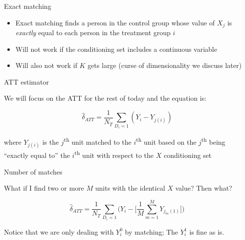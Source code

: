 \documentclass{beamer}
\begin{document}
\begin{frame}{Exact matching}

\begin{itemize}
\item Exact matching finds a person in the control group whose value of $X_j$ is \emph{exactly} equal to each person in the treatment group $i$
\item Will not work if the conditioning set includes a continuous variable
\item Will also not work if $K$ gets large (curse of dimensionality we discuss later)
\end{itemize}

\end{frame}



\begin{frame}{ATT estimator}

We will focus on the ATT for the rest of today and the equation is:

\begin{equation}
\widehat{\delta}_{ATT} = \dfrac{1}{N_T} \sum_{D_i=1}(Y_i - Y_{j(i)})
\label{eq:att_simplematch}
\end{equation}

where $Y_{j(i)}$ is the $j$\textsuperscript{th} unit matched to the $i$\textsuperscript{th} unit based on the $j$\textsuperscript{th} being ``exactly equal to'' the $i$\textsuperscript{th} unit with respect to the $X$ conditioning set

\end{frame}

\begin{frame}{Number of matches}

What if I find two or more $M$ units with the identical $X$ value? Then what?

\begin{equation}
\widehat{\delta}_{ATT} = \dfrac{1}{N_T} \sum_{D_i=1} \bigg ( Y_i - \bigg [\dfrac{1}{M} \sum_{m=1}^M Y_{j_m(1)} \bigg ] \bigg )
\label{eq:att_match}
\end{equation}

\bigskip

Notice that we are only dealing with $Y^0_i$ by matching; The $Y^1_i$ is fine as is.

\end{frame}
\end{document}
